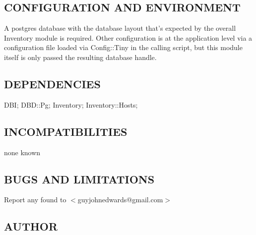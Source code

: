 \documentclass{book}
\begin{document}
\subsection{CONFIGURATION AND ENVIRONMENT}
\label{Inventory::Models_CONFIGURATION_AND_ENVIRONMENT}
\hypertarget{Inventory::Models_CONFIGURATION_AND_ENVIRONMENT}{}



A postgres database with the database layout that's expected by the overall Inventory module is required. Other configuration is at the application level via a configuration file loaded via Config::Tiny in the calling script, but this module itself is only passed the resulting database handle.


\subsection{DEPENDENCIES}
\label{Inventory::Models_DEPENDENCIES}
\hypertarget{Inventory::Models_DEPENDENCIES}{}



DBI; DBD::Pg; Inventory; Inventory::Hosts;


\subsection{INCOMPATIBILITIES}
\label{Inventory::Models_INCOMPATIBILITIES}
\hypertarget{Inventory::Models_INCOMPATIBILITIES}{}



none known


\subsection{BUGS AND LIMITATIONS}
\label{Inventory::Models_BUGS_AND_LIMITATIONS}
\hypertarget{Inventory::Models_BUGS_AND_LIMITATIONS}{}



Report any found to $<$guyjohnedwards@gmail.com$>$


\subsection{AUTHOR}
\label{Inventory::Models_AUTHOR}
\hypertarget{Inventory::Models_AUTHOR}{}
\end{document}
